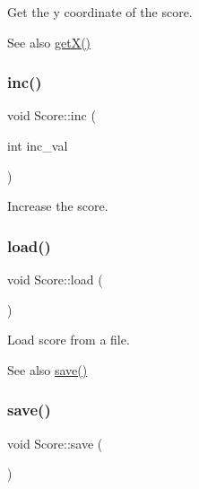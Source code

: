 Get the y coordinate of the score. 

\begin{DoxySeeAlso}{See also}
\mbox{\hyperlink{class_score_aaae02b51a637062330b3259952974ae8}{get\+X()}} 
\end{DoxySeeAlso}
\mbox{\label{class_score_a033a9d0790e42f3803d353bf2e7027e2}} 
\subsubsection{\texorpdfstring{inc()}{inc()}}
{\footnotesize\ttfamily void Score\+::inc (\begin{DoxyParamCaption}\item[{int}]{inc\+\_\+val }\end{DoxyParamCaption})\hspace{0.3cm}{\ttfamily [inline]}}



Increase the score. 

\mbox{\label{class_score_a81abff296ffdfa01fac193c6a3109080}} 
\subsubsection{\texorpdfstring{load()}{load()}}
{\footnotesize\ttfamily void Score\+::load (\begin{DoxyParamCaption}{ }\end{DoxyParamCaption})\hspace{0.3cm}{\ttfamily [inline]}}



Load score from a file. 

\begin{DoxySeeAlso}{See also}
\mbox{\hyperlink{class_score_a81a84a2163ddb4d23b3fc96b1dd54049}{save()}} 
\end{DoxySeeAlso}
\mbox{\label{class_score_a81a84a2163ddb4d23b3fc96b1dd54049}} 
\subsubsection{\texorpdfstring{save()}{save()}}
{\footnotesize\ttfamily void Score\+::save (\begin{DoxyParamCaption}{ }\end{DoxyParamCaption})\hspace{0.3cm}{\ttfamily [inline]}}



